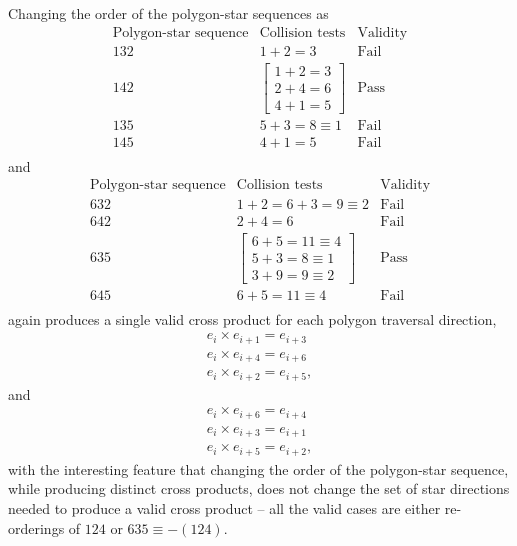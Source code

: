 \documentclass[11pt]{article}
\newcommand{\bv}[1][]{e_{#1}}
\begin{document}
Changing the order of the polygon-star sequences as
\begin{equation}
\begin{array}{c|c|c}
\text{Polygon-star sequence} & \text{Collision tests} & \text{Validity} \\\hline \hline
1 3 2& 1+2 = 3 & \text{Fail} \\%
1 4 2 & \begin{bmatrix} 1+2=3 \\ 2+4=6 \\ 4+1 = 5 \end{bmatrix} &  \text{Pass}\\
1 3 5  & 5+3=8\equiv1 & \text{Fail} \\
1 4 5 & 4+1=5 & \text{Fail} \\
\end{array}
\end{equation}
and
\begin{equation}
\begin{array}{c|c|c}
\text{Polygon-star sequence} & \text{Collision tests} & \text{Validity} \\\hline \hline
6 3 2 & 1+2 = 6+3=9\equiv2 & \text{Fail} \\%
6 4 2 & 2+4=6 & \text{Fail}\\
6 3 5 &  \begin{bmatrix} 6+5=11\equiv4 \\ 5+3=8\equiv1 \\ 3+9=9\equiv2 \end{bmatrix} &  \text{Pass} \\
6 4 5 &6+5=11\equiv4 & \text{Fail} \\
\end{array}
\end{equation}
 again produces a single valid cross product for each polygon traversal direction,
  \begin{subequations}
\begin{align}
\bv[i]\times\bv[i+1] = \bv[i+3] \\
\bv[i]\times\bv[i+4] = \bv[i+6] \\
\bv[i]\times\bv[i+2] = \bv[i+5],
\end{align}
\end{subequations}
and
\begin{subequations}
\begin{align}
\bv[i]\times\bv[i+6] = \bv[i+4] \\
\bv[i]\times\bv[i+3] = \bv[i+1] \\
\bv[i]\times\bv[i+5] = \bv[i+2],
\end{align}
\end{subequations}
 with the interesting feature that changing the order of the polygon-star sequence, while producing distinct cross products, does not change the set of star directions needed to produce a valid cross product -- all the valid cases are either re-orderings of $124$ or $635\equiv-(124)$.
\end{document}
